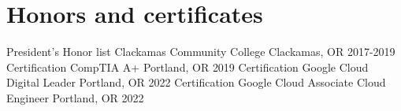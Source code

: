 \section{Honors and certificates}
\begin{cvhonors}

\cvhonor
{President's Honor list} %
{Clackamas Community College} %
{Clackamas, OR} %
{2017-2019} %
\cvhonor
{Certification} %
{CompTIA A+} %
{Portland, OR} %
{2019} %
\cvhonor
{Certification} %
{Google Cloud Digital Leader} %
{Portland, OR} %
{2022} %
\cvhonor
{Certification} %
{Google Cloud Associate Cloud Engineer} %
{Portland, OR} %
{2022} %
\end{cvhonors}
